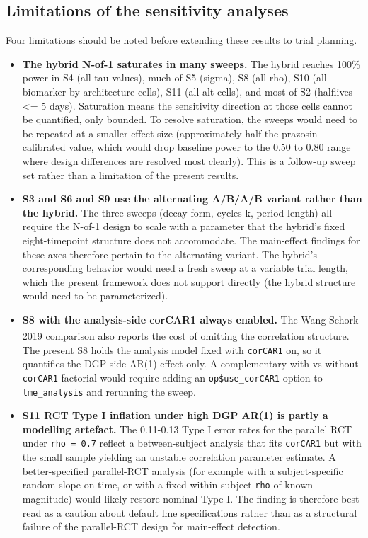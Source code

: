 \documentclass[
  11pt,
]{article}
\providecommand{\tightlist}{%
  \setlength{\itemsep}{0pt}\setlength{\parskip}{0pt}}
\begin{document}
\subsection{Limitations of the sensitivity
analyses}\label{limitations-of-the-sensitivity-analyses}

Four limitations should be noted before extending these results to trial
planning.

\begin{itemize}
\tightlist
\item
  \textbf{The hybrid N-of-1 saturates in many sweeps.} The hybrid
  reaches 100\% power in S4 (all tau values), much of S5 (sigma), S8
  (all rho), S10 (all biomarker-by-architecture cells), S11 (all alt
  cells), and most of S2 (halflives \textless= 5 days). Saturation means
  the sensitivity direction at those cells cannot be quantified, only
  bounded. To resolve saturation, the sweeps would need to be repeated
  at a smaller effect size (approximately half the prazosin-calibrated
  value, which would drop baseline power to the 0.50 to 0.80 range where
  design differences are resolved most clearly). This is a follow-up
  sweep set rather than a limitation of the present results.
\item
  \textbf{S3 and S6 and S9 use the alternating A/B/A/B variant rather
  than the hybrid.} The three sweeps (decay form, cycles k, period
  length) all require the N-of-1 design to scale with a parameter that
  the hybrid's fixed eight-timepoint structure does not accommodate. The
  main-effect findings for these axes therefore pertain to the
  alternating variant. The hybrid's corresponding behavior would need a
  fresh sweep at a variable trial length, which the present framework
  does not support directly (the hybrid structure would need to be
  parameterized).
\item
  \textbf{S8 with the analysis-side corCAR1 always enabled.} The
  Wang-Schork
  2019\textsuperscript{}
  comparison also reports the cost of omitting the correlation
  structure. The present S8 holds the analysis model fixed with
  \texttt{corCAR1} on, so it quantifies the DGP-side AR(1) effect only.
  A complementary with-vs-without-\texttt{corCAR1} factorial would
  require adding an \texttt{op\$use\_corCAR1} option to
  \texttt{lme\_analysis} and rerunning the sweep.
\item
  \textbf{S11 RCT Type I inflation under high DGP AR(1) is partly a
  modelling artefact.} The 0.11-0.13 Type I error rates for the parallel
  RCT under \texttt{rho\ =\ 0.7} reflect a between-subject analysis that
  fits \texttt{corCAR1} but with the small sample yielding an unstable
  correlation parameter estimate. A better-specified parallel-RCT
  analysis (for example with a subject-specific random slope on time, or
  with a fixed within-subject \texttt{rho} of known magnitude) would
  likely restore nominal Type I. The finding is therefore best read as a
  caution about default lme specifications rather than as a structural
  failure of the parallel-RCT design for main-effect detection.
\end{itemize}
\end{document}

